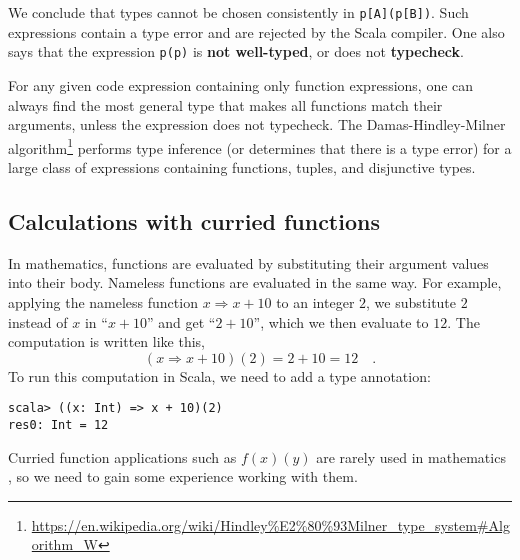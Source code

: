 We conclude that types cannot be chosen consistently in \lstinline!p[A](p[B])!.
Such expressions contain a type error and are rejected by the Scala
compiler. One also says that the expression \lstinline!p(p)!
is \textbf{not well-typed}, or does
not \textbf{typecheck}.

For any given code expression containing only function expressions,
one can always find the most general type that makes all functions
match their arguments, unless the expression does not typecheck. The
Damas-Hindley-Milner algorithm\footnote{\href{https://en.wikipedia.org/wiki/Hindley\%E2\%80\%93Milner_type_system\#Algorithm_W}{https://en.wikipedia.org/wiki/Hindley\%E2\%80\%93Milner\_type\_system\#Algorithm\_W}}
performs type inference (or determines that there is a type error)
for a large class of expressions containing functions, tuples, and
disjunctive types. 

\subsection{Calculations with curried functions}

In mathematics, functions are evaluated by substituting their argument
values into their body. Nameless functions are evaluated in the same
way. For example, applying the nameless function $x\Rightarrow x+10$
to an integer $2$, we substitute $2$ instead of $x$ in “$x+10$”
and get “$2+10$”, which we then evaluate to $12$. The computation
is written like this, 
\[
(x\Rightarrow x+10)(2)=2+10=12\quad.
\]
To run this computation in Scala, we need to add a type annotation:
\begin{lstlisting}
scala> ((x: Int) => x + 10)(2)
res0: Int = 12 
\end{lstlisting}
Curried function applications such as $f(x)(y)$ are rarely used in
mathematics , so we need to gain some experience working with them.

